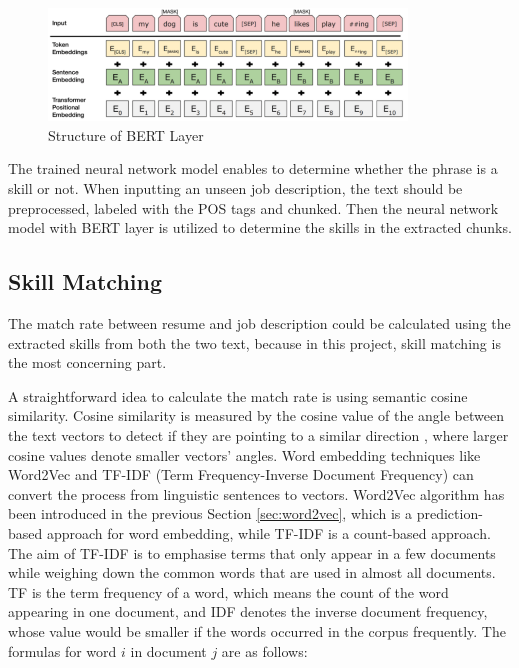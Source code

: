  \begin{figure}[H]
    \centering
    \includegraphics[width=0.85\textwidth]{images/BERT.png}
    \caption{Structure of BERT Layer \cite{ketterer2}}
    \label{fig:11}
\end{figure}



The trained neural network model enables to determine whether the phrase is a skill or not. When inputting an unseen job description, the text should be preprocessed, labeled with the POS tags and chunked. Then the neural network model with BERT layer is utilized to determine the skills in the extracted chunks.


\subsection{Skill Matching}

The match rate between resume and job description could be calculated using the extracted skills from both the two text, because in this project, skill matching is the most concerning part.

A straightforward idea to calculate the match rate is using semantic cosine similarity. Cosine similarity is measured by the cosine value of the angle between the text vectors to detect if they are pointing to a similar direction \cite{han2011data}, where larger cosine values denote smaller vectors' angles. Word embedding techniques like Word2Vec and TF-IDF (Term Frequency-Inverse Document Frequency) can convert the process from linguistic sentences to vectors. Word2Vec algorithm has been introduced in the previous Section \ref{sec:word2vec}, which is a prediction-based approach for word embedding, while TF-IDF is a count-based approach. The aim of TF-IDF is to emphasise terms that only appear in a few documents while weighing down the common words that are used in almost all documents. TF is the term frequency of a word, which means the count of the word appearing in one document, and IDF denotes the inverse document frequency, whose value would be smaller if the words occurred in the corpus frequently. The formulas for word $i$ in document $j$ are as follows:

